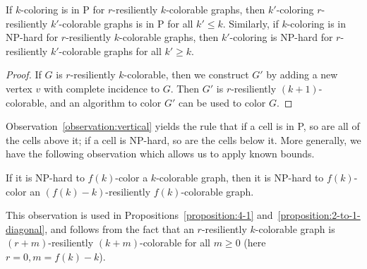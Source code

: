 \begin{observation}\label{observation:vertical}
If $k$-coloring is in P for $r$-resiliently $k$-colorable graphs, then
$k'$-coloring $r$-resiliently $k'$-colorable graphs is in P for all $k' \leq
k$. Similarly, if $k$-coloring is in NP-hard for $r$-resiliently $k$-colorable
graphs, then $k'$-coloring is NP-hard for $r$-resiliently $k'$-colorable graphs
for all $k' \geq k$.
\end{observation}
\begin{proof}
If $G$ is $r$-resiliently $k$-colorable, then we construct $G'$ by adding a
new vertex $v$ with complete incidence to $G$. Then $G'$ is $r$-resiliently
$(k+1)$-colorable, and an algorithm to color $G'$ can be used to color $G$.
\end{proof}

Observation~\ref{observation:vertical} yields the rule that if a cell is in P, so are
all of the cells above it; if a cell is NP-hard, so are the cells below it.
More generally, we have the following observation which allows us to apply
known bounds.

\begin{observation}\label{observation:function-bound}
If it is NP-hard to $f(k)$-color a $k$-colorable graph, then it is NP-hard to
$f(k)$-color an $(f(k)-k)$-resiliently $f(k)$-colorable graph.
\end{observation}

This observation is used in Propositions~\ref{proposition:4-1}
and~\ref{proposition:2-to-1-diagonal}, and follows from the fact that an
$r$-resiliently $k$-colorable graph is $(r+m)$-resiliently $(k+m)$-colorable
for all $m \geq 0$ (here $r = 0, m = f(k) - k$). 

